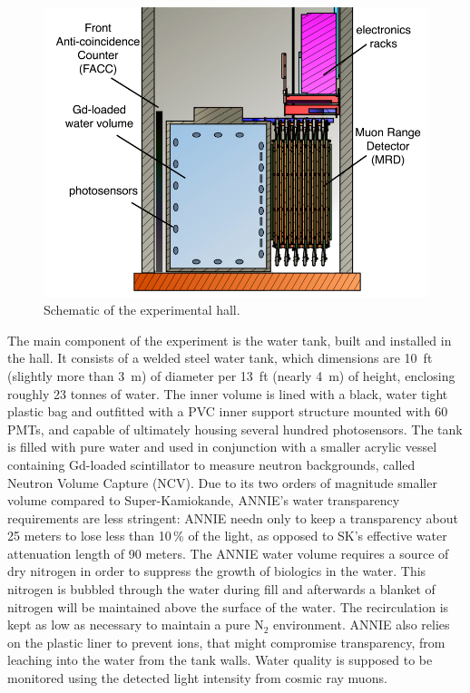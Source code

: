 \begin{figure}
  \centering
  \includegraphics[scale=0.25]{pics/ANNIEreduced2}
  \caption{Schematic of the experimental hall.}
  \label{fig:anniehall}
\end{figure}

 The main component of the experiment is the water tank, built and installed in the hall.
 It consists of a welded steel water tank, which dimensions are 10~ft (slightly more than 3~m) %
 of diameter per 13~ft (nearly 4~m) of height, enclosing roughly 23 tonnes of water.
 The inner volume is lined with a black, water tight plastic bag and outfitted with %
 a PVC inner support structure mounted with 60 PMTs, and capable of ultimately housing several %
 hundred photosensors. 
 The tank is filled with pure water and used in conjunction with a smaller %
 acrylic vessel containing Gd-loaded scintillator to measure neutron backgrounds, called %
 Neutron Volume Capture (NCV).
 Due to its two orders of magnitude smaller volume compared to Super-Kamiokande, %
 ANNIE’s water transparency requirements are less stringent: %
 ANNIE needn only to keep a transparency about 25 meters to lose less than 10\,\% of the light, %
 as opposed to SK’s effective water attenuation length of 90 meters.
 The ANNIE water volume requires a source of dry nitrogen in order to suppress the growth of %
 biologics in the water.
 This nitrogen is bubbled through the water during fill and afterwards a blanket of nitrogen %
 will be maintained above the surface of the water. 
 The recirculation is kept as low as necessary to maintain a pure N$_2$ environment.
 ANNIE also relies on the plastic liner to prevent ions, that might compromise transparency, %
 from leaching into the water from the tank walls.
 Water quality is supposed to be monitored using the detected light intensity from cosmic ray muons.
 
